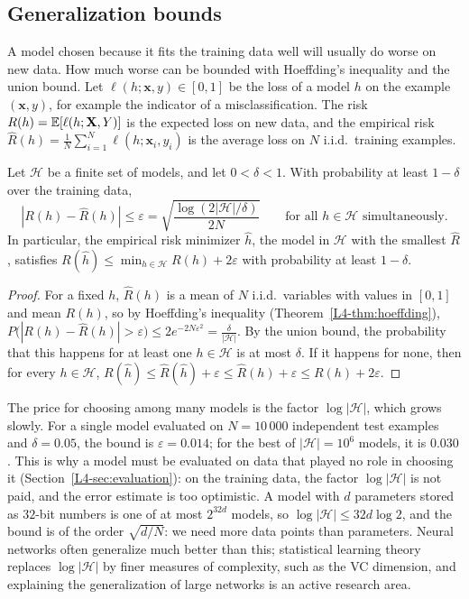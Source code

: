 \subsection{Generalization bounds}\label{L4-sec:generalization}

A model chosen because it fits the training data well will usually do worse on new data. How much worse can be bounded with Hoeffding's inequality and the union bound. Let $\ell(h; \mathbf{x}, y) \in [0, 1]$ be the loss of a model $h$ on the example $(\mathbf{x}, y)$, for example the indicator of a misclassification. The risk $R(h) = \mathbb{E}[\ell(h; \mathbf{X}, Y)]$ is the expected loss on new data, and the empirical risk $\hat R(h) = \frac{1}{N}\sum_{i=1}^N \ell(h; \mathbf{x}_i, y_i)$ is the average loss on $N$ i.i.d.\ training examples.

\begin{theorem}\label{L4-thm:generalization}
    Let $\mathcal{H}$ be a finite set of models, and let $0 < \delta < 1$. With probability at least $1 - \delta$ over the training data,
    \[|R(h) - \hat R(h)| \leq \varepsilon = \sqrt{\frac{\log(2|\mathcal{H}|/\delta)}{2N}} \qquad \text{for all } h \in \mathcal{H} \text{ simultaneously}.\]
    In particular, the empirical risk minimizer $\hat h$, the model in $\mathcal{H}$ with the smallest $\hat R$, satisfies $R(\hat h) \leq \min_{h \in \mathcal{H}} R(h) + 2\varepsilon$ with probability at least $1 - \delta$.
\end{theorem}

\begin{proof}
    For a fixed $h$, $\hat R(h)$ is a mean of $N$ i.i.d.\ variables with values in $[0, 1]$ and mean $R(h)$, so by Hoeffding's inequality (Theorem~\ref{L4-thm:hoeffding}), $P\big(|R(h) - \hat R(h)| > \varepsilon\big) \leq 2e^{-2N\varepsilon^2} = \frac{\delta}{|\mathcal{H}|}$. By the union bound, the probability that this happens for at least one $h \in \mathcal{H}$ is at most $\delta$. If it happens for none, then for every $h \in \mathcal{H}$, $R(\hat h) \leq \hat R(\hat h) + \varepsilon \leq \hat R(h) + \varepsilon \leq R(h) + 2\varepsilon$.
\end{proof}

The price for choosing among many models is the factor $\log|\mathcal{H}|$, which grows slowly. For a single model evaluated on $N = 10\,000$ independent test examples and $\delta = 0.05$, the bound is $\varepsilon = 0.014$; for the best of $|\mathcal{H}| = 10^6$ models, it is $0.030$. This is why a model must be evaluated on data that played no role in choosing it (Section~\ref{L4-sec:evaluation}): on the training data, the factor $\log|\mathcal{H}|$ is not paid, and the error estimate is too optimistic. A model with $d$ parameters stored as $32$-bit numbers is one of at most $2^{32d}$ models, so $\log|\mathcal{H}| \leq 32d\log 2$, and the bound is of the order $\sqrt{d/N}$: we need more data points than parameters. Neural networks often generalize much better than this; statistical learning theory replaces $\log|\mathcal{H}|$ by finer measures of complexity, such as the VC dimension, and explaining the generalization of large networks is an active research area.

